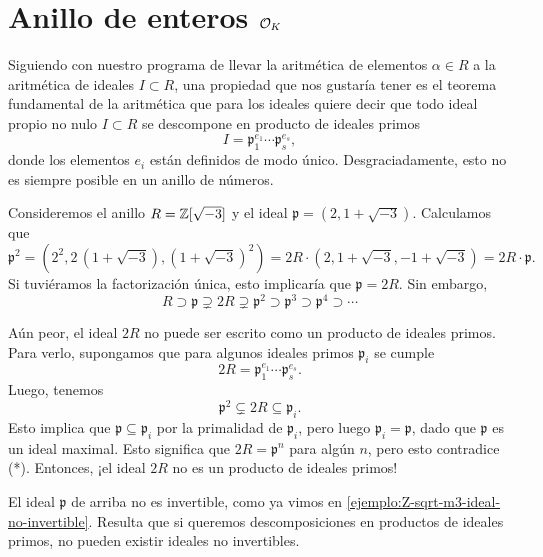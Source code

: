 \section{Anillo de enteros $\mathcal{O}_K$}

Siguiendo con nuestro programa de llevar la aritmética de elementos
$\alpha \in R$ a la aritmética de ideales $I \subset R$, una propiedad que nos
gustaría tener es el teorema fundamental de la aritmética que para los ideales
quiere decir que todo ideal propio no nulo $I \subset R$ se descompone en
producto de ideales primos
$$I = \mathfrak{p}_1^{e_1}\cdots \mathfrak{p}_s^{e_s},$$
donde los elementos $e_i$ están definidos de modo único.
Desgraciadamente, esto no es siempre posible en un anillo de números.

\begin{ejemplo}
  Consideremos el anillo $R = \mathbb{Z} [\sqrt{-3}]$ y el ideal
  $\mathfrak{p} = (2, 1+\sqrt{-3})$.  Calculamos que
  \[ \mathfrak{p}^2 = (2^2, 2\,(1+\sqrt{-3}), (1 + \sqrt{-3})^2) =
     2R\cdot (2, 1+\sqrt{-3}, -1 + \sqrt{-3}) = 2R\cdot \mathfrak{p}. \]
  Si tuviéramos la factorización única, esto implicaría que $\mathfrak{p} = 2R$.
  Sin embargo,
  \[ \tag{*} R \supset \mathfrak{p} \supsetneq 2R \supsetneq \mathfrak{p}^2
     \supset \mathfrak{p}^3 \supset \mathfrak{p}^4 \supset \cdots \]
 
  Aún peor, el ideal $2R$ no puede ser escrito como un producto de ideales
  primos. Para verlo, supongamos que para algunos ideales primos $\mathfrak{p}_i$
  se cumple
  $$2R = \mathfrak{p}_1^{e_1} \cdots \mathfrak{p}_s^{e_s}.$$
  Luego, tenemos
  $$\mathfrak{p}^2 \subsetneq 2R \subseteq \mathfrak{p}_i.$$
  Esto implica que $\mathfrak{p} \subseteq \mathfrak{p}_i$ por la primalidad de
  $\mathfrak{p}_i$, pero luego $\mathfrak{p}_i = \mathfrak{p}$, dado que
  $\mathfrak{p}$ es un ideal maximal. Esto significa que $2R = \mathfrak{p}^n$
  para algún $n$, pero esto contradice (*). Entonces, ¡el ideal $2R$ no es un
  producto de ideales primos!
\end{ejemplo}

El ideal $\mathfrak{p}$ de arriba no es invertible, como ya vimos en
\ref{ejemplo:Z-sqrt-m3-ideal-no-invertible}. Resulta que si queremos
descomposiciones en productos de ideales primos, no pueden existir ideales no
invertibles.

